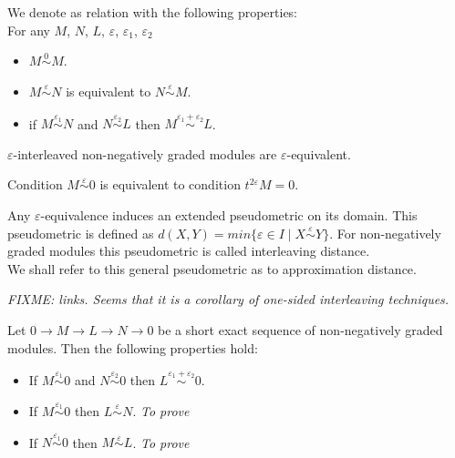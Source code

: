 \begin{definition}
  We denote as  relation with the following properties:\\
  For any $M$, $N$, $L$, $\varepsilon$, $\varepsilon_1$, $\varepsilon_2$
  \begin{itemize}
    \item $M \stackrel{0}{\sim} M$.
    \item $M \stackrel{\varepsilon}{\sim} N$ is equivalent to $N \stackrel{\varepsilon}{\sim} M$.
    \item if $M \stackrel{\varepsilon_1}{\sim} N$ and $N \stackrel{\varepsilon_2}{\sim} L$ then $M \stackrel{\varepsilon_1 + \varepsilon_2}{\sim} L$.
  \end{itemize}
\end{definition}

\begin{proposition}
  $\varepsilon$-interleaved non-negatively graded modules are $\varepsilon$-equivalent.
\end{proposition}

\begin{remark}
  \label{epstriv}
  Condition $M \stackrel{\varepsilon}{\sim} 0$ is equivalent to condition $t^{2\varepsilon}M = 0$.
\end{remark}

\begin{definition}
  Any $\varepsilon$-equivalence induces an extended pseudometric on its domain. This pseudometric is defined as $d(X,Y) = min\{\varepsilon \in I\;|\;X \stackrel{\varepsilon}{\sim} Y\}$. For non-negatively graded modules this pseudometric is called interleaving distance. {\cite[Definition 2.12]{GS16}}\\
  We shall refer to this general pseudometric as to approximation distance.
\end{definition}

\textit{FIXME: links. Seems that it is a corollary of one-sided interleaving techniques.}
\begin{lemma}
  \label{ops}
  Let $0 \to M \to L \to N \to 0$ be a short exact sequence of non-negatively graded modules. Then the following properties hold:
  \begin{itemize}
    \item If $M \stackrel{\varepsilon_1}{\sim} 0$ and $N \stackrel{\varepsilon_2}{\sim} 0$ then $L \stackrel{\varepsilon_1 + \varepsilon_2}{\sim} 0$. {\cite[Proposition 4.6]{GS16}}
    \item If $M \stackrel{\varepsilon_1}{\sim} 0$ then $L \stackrel{\varepsilon}{\sim} N$. \textit{To prove}
    \item If $N \stackrel{\varepsilon_1}{\sim} 0$ then $M \stackrel{\varepsilon}{\sim} L$. \textit{To prove}
  \end{itemize}
\end{lemma}
